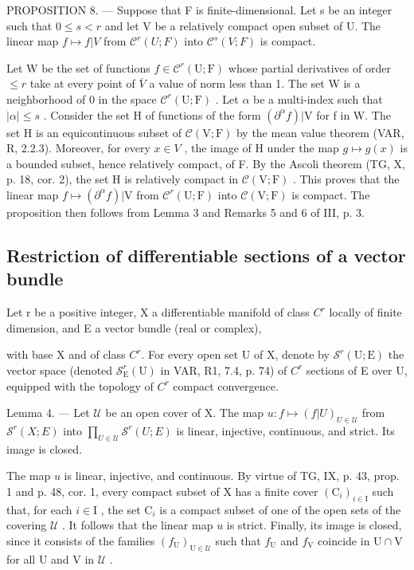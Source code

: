 PROPOSITION 8. --- Suppose that F is finite-dimensional. Let s be an integer such that \(0 \leqslant s < r\) and let V be a relatively compact open subset of U. The linear map \(f \mapsto f|V\) from \(\mathcal{C}^{r}(U;F)\) into \(\mathcal{C}^{s}(V;F)\) is compact.

Let W be the set of functions \(f \in \mathcal{C}^{r}(\mathrm{U};\mathrm{F})\) whose partial derivatives of order \(\leqslant r\) take at every point of \(\overline{V}\) a value of norm less than 1. The set W is a neighborhood of 0 in the space \(\mathcal{C}^{r}(\mathrm{U};\mathrm{F})\) . Let \(\alpha\) be a multi-index such that \(|\alpha| \leqslant s\) . Consider the set H of functions of the form \((\partial^{\alpha}f)|\mathrm{V}\) for f in W. The set H is an equicontinuous subset of \(\mathcal{C}(\mathrm{V};\mathrm{F})\) by the mean value theorem (VAR, R, 2.2.3). Moreover, for every \(x \in V\) , the image of H under the map \(g \mapsto g(x)\) is a bounded subset, hence relatively compact, of F. By the Ascoli theorem (TG, X, p. 18, cor. 2), the set H is relatively compact in \(\mathcal{C}(\mathrm{V};\mathrm{F})\) . This proves that the linear map \(f \mapsto (\partial^{\alpha}f)|\mathrm{V}\) from \(\mathcal{C}^{r}(\mathrm{U};\mathrm{F})\) into \(\mathcal{C}(\mathrm{V};\mathrm{F})\) is compact. The proposition then follows from Lemma 3 and Remarks 5 and 6 of III, p. 3.

\subsection{Restriction of differentiable sections of a vector bundle}

Let r be a positive integer, X a differentiable manifold of class \(C^{r}\) locally of finite dimension, and E a vector bundle (real or complex),

with base X and of class \(C^{r}\). For every open set U of X, denote by \(\mathcal{S}^{r}(\mathrm{U};\mathrm{E})\) the vector space (denoted \(\mathcal{S}_{\mathrm{E}}^{r}(\mathrm{U})\) in VAR, R1, 7.4, p. 74) of \(C^{r}\) sections of E over U, equipped with the topology of \(C^{r}\) compact convergence.

Lemma 4. --- Let \(\mathcal{U}\) be an open cover of X. The map \(u: f \mapsto (f|U)_{U \in \mathcal{U}}\) from \(\mathcal{S}^{r}(X;E)\) into \(\prod_{U \in \mathcal{U}} \mathcal{S}^{r}(U;E)\) is linear, injective, continuous, and strict. Its image is closed.

The map \(u\) is linear, injective, and continuous. By virtue of TG, IX, p. 43, prop. 1 and p. 48, cor. 1, every compact subset of X has a finite cover \((\mathrm{C}_i)_{i\in \mathrm{I}}\) such that, for each \(i\in \mathrm{I}\) , the set \(\mathrm{C}_i\) is a compact subset of one of the open sets of the covering \(\mathcal{U}\) . It follows that the linear map \(u\) is strict. Finally, its image is closed, since it consists of the families \((f_{\mathrm{U}})_{\mathrm{U}\in \mathcal{U}}\) such that \(f_{\mathrm{U}}\) and \(f_{\mathrm{V}}\) coincide in \(\mathrm{U}\cap \mathrm{V}\) for all U and V in \(\mathcal{U}\) .

